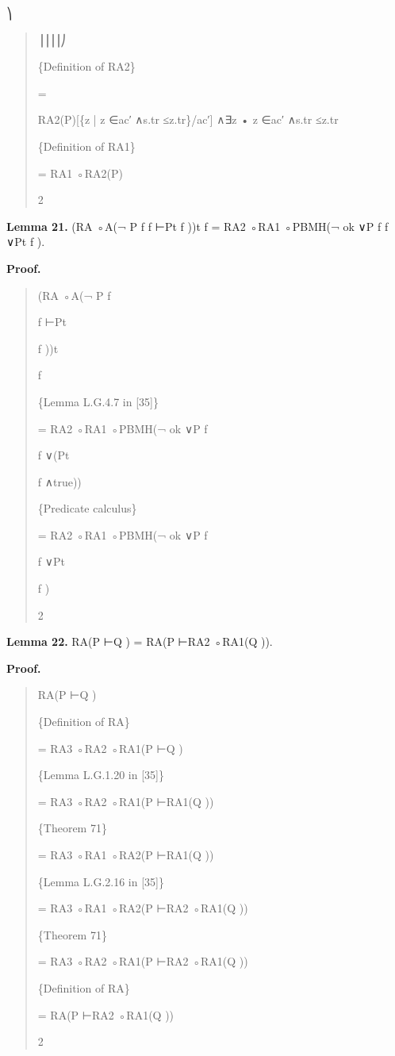 \documentclass[11pt]{article}
\begin{document}
⎞

\begin{quote}\small\raggedright
⎟⎟⎟⎟⎠
\par
\{Definition of RA2\}
\par
=
\par
RA2(P)[\{z | z ∈ac′ ∧s.tr ≤z.tr\}/ac′] ∧∃z • z ∈ac′ ∧s.tr ≤z.tr
\par
\{Definition of RA1\}
\par
= RA1 ◦RA2(P)
\par
2
\end{quote}

\noindent\textbf{Lemma 21.} (RA ◦A(¬ P f f ⊢Pt f ))t f = RA2 ◦RA1 ◦PBMH(¬ ok ∨P f f ∨Pt f ).


\noindent\textbf{Proof.}


\begin{quote}\small\raggedright
(RA ◦A(¬ P f
\par
f ⊢Pt
\par
f ))t
\par
f
\par
\{Lemma L.G.4.7 in [35]\}
\par
= RA2 ◦RA1 ◦PBMH(¬ ok ∨P f
\par
f ∨(Pt
\par
f ∧true))
\par
\{Predicate calculus\}
\par
= RA2 ◦RA1 ◦PBMH(¬ ok ∨P f
\par
f ∨Pt
\par
f )
\par
2
\end{quote}

\noindent\textbf{Lemma 22.} RA(P ⊢Q ) = RA(P ⊢RA2 ◦RA1(Q )).


\noindent\textbf{Proof.}


\begin{quote}\small\raggedright
RA(P ⊢Q )
\par
\{Definition of RA\}
\par
= RA3 ◦RA2 ◦RA1(P ⊢Q )
\par
\{Lemma L.G.1.20 in [35]\}
\par
= RA3 ◦RA2 ◦RA1(P ⊢RA1(Q ))
\par
\{Theorem 71\}
\par
= RA3 ◦RA1 ◦RA2(P ⊢RA1(Q ))
\par
\{Lemma L.G.2.16 in [35]\}
\par
= RA3 ◦RA1 ◦RA2(P ⊢RA2 ◦RA1(Q ))
\par
\{Theorem 71\}
\par
= RA3 ◦RA2 ◦RA1(P ⊢RA2 ◦RA1(Q ))
\par
\{Definition of RA\}
\par
= RA(P ⊢RA2 ◦RA1(Q ))
\par
2
\end{quote}
\end{document}

